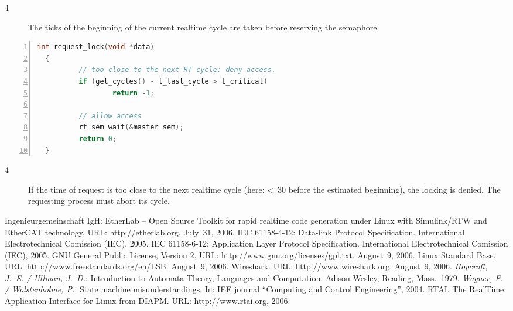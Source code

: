 \documentclass[a4paper,12pt,BCOR6mm,bibtotoc,idxtotoc]{scrbook}
\renewcommand\nomname{Glossary}
\newcommand{\linenum}[1]{\normalfont\textcircled{\tiny #1}}
\begin{document}
\begin{description}
\item[\linenum{4}] The ticks of the beginning of
  the current realtime cycle are taken before reserving the semaphore.
\end{description}

\begin{lstlisting}[gobble=2,language=C,numbers=left,caption={Request callback
    for reduced jitter},label={lst:redreq}]
  int request_lock(void *data)
  {
          // too close to the next RT cycle: deny access.
          if (get_cycles() - t_last_cycle > t_critical)
                  return -1;

          // allow access
          rt_sem_wait(&master_sem);
          return 0;
  }
\end{lstlisting}

\begin{description}

\item[\linenum{4}] If the time of request is too close to the next realtime
cycle (here: \unit{<30}{\micro\second} before the estimated beginning), the
locking is denied. The requesting process must abort its cycle.

\end{description}


\begin{thebibliography}{99}
 Ingenieurgemeinschaft IgH: EtherLab -- Open Source
  Toolkit for rapid realtime code generation under Linux with
  Simulink/RTW and EtherCAT technology. URL: http://etherlab.org,
  July~31, 2006.
 IEC 61158-4-12: Data-link Protocol Specification.
  International Electrotechnical Comission (IEC), 2005.
 IEC 61158-6-12: Application Layer Protocol
  Specification. International Electrotechnical Comission (IEC), 2005.
 GNU General Public License, Version 2. URL:
  http://www.gnu.org/licenses/gpl.txt. August~9, 2006.
 Linux Standard Base. URL:
  http://www.freestandards.org/en/LSB. August~9, 2006.
 Wireshark. URL: http://www.wireshark.org.
  August~9, 2006.
 {\it Hopcroft, J.~E. / Ullman, J.~D.}: Introduction
  to Automata Theory, Languages and Computation. Adison-Wesley,
  Reading, Mass.~1979.
 {\it Wagner, F. / Wolstenholme, P.}: State machine
  misunderstandings. In: IEE journal ``Computing and Control
  Engineering'', 2004.
 RTAI. The RealTime Application Interface for Linux from
  DIAPM. URL: http://www.rtai.org, 2006.
\end{thebibliography}

\printnomenclature
\addcontentsline{toc}{chapter}{\nomname}
\markleft{\nomname}

\printindex
{}

\end{document}
